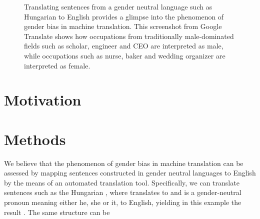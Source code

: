 \documentclass{article}
\begin{document}
\begin{figure}[h]
	\centering
	\label{fig:screenshot-gtranslate-hungarian}
	\caption{Translating sentences from a gender neutral language such as Hungarian to English provides a glimpse into the phenomenon of gender bias in machine translation. This screenshot from Google Translate shows how occupations from traditionally male-dominated fields such as scholar, engineer and CEO are interpreted as male, while occupations such as nurse, baker and wedding organizer are interpreted as female.}
\end{figure}



\section{Motivation}

\section{Methods}

We believe that the phenomenon of gender bias in machine translation can be assessed by mapping sentences constructed in gender neutral languages to English by the means of an automated translation tool. Specifically, we can translate sentences such as the Hungarian , where  translates to  and  is a gender-neutral pronoun meaning either he, she or it, to English, yielding in this example the result . The same structure can be 
\end{document}
